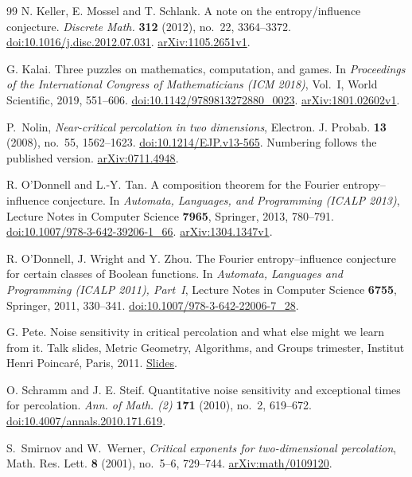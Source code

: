 \begin{thebibliography}{99}
N. Keller, E. Mossel and T. Schlank.
A note on the entropy/influence conjecture.
\emph{Discrete Math.} \textbf{312} (2012), no.~22, 3364--3372.
\href{https://doi.org/10.1016/j.disc.2012.07.031}{doi:10.1016/j.disc.2012.07.031}.
\href{https://arxiv.org/abs/1105.2651v1}{arXiv:1105.2651v1}.

G. Kalai.
Three puzzles on mathematics, computation, and games.
In \emph{Proceedings of the International Congress of Mathematicians (ICM 2018)}, Vol.~I, World Scientific, 2019, 551--606.
\href{https://doi.org/10.1142/9789813272880_0023}{doi:10.1142/9789813272880\_0023}.
\href{https://arxiv.org/abs/1801.02602v1}{arXiv:1801.02602v1}.

P.~Nolin,
\emph{Near-critical percolation in two dimensions},
Electron. J. Probab. \textbf{13} (2008), no.~55, 1562--1623.
\href{https://doi.org/10.1214/EJP.v13-565}{doi:10.1214/EJP.v13-565}.
Numbering follows the published version.
\href{https://arxiv.org/abs/0711.4948}{arXiv:0711.4948}.

R. O'Donnell and L.-Y. Tan.
A composition theorem for the Fourier entropy--influence conjecture.
In \emph{Automata, Languages, and Programming (ICALP 2013)},
Lecture Notes in Computer Science \textbf{7965}, Springer, 2013, 780--791.
\href{https://doi.org/10.1007/978-3-642-39206-1_66}{doi:10.1007/978-3-642-39206-1\_66}.
\href{https://arxiv.org/abs/1304.1347v1}{arXiv:1304.1347v1}.

R. O'Donnell, J. Wright and Y. Zhou.
The Fourier entropy--influence conjecture for certain classes of Boolean functions.
In \emph{Automata, Languages and Programming (ICALP 2011), Part~I},
Lecture Notes in Computer Science \textbf{6755}, Springer, 2011, 330--341.
\href{https://doi.org/10.1007/978-3-642-22006-7_28}{doi:10.1007/978-3-642-22006-7\_28}.

G. Pete.
Noise sensitivity in critical percolation and what else might we learn from it.
Talk slides, Metric Geometry, Algorithms, and Groups trimester,
Institut Henri Poincar\'e, Paris, 2011.
\href{https://math.bme.hu/~gabor/IHP.pdf}{Slides}.

O. Schramm and J. E. Steif.
Quantitative noise sensitivity and exceptional times for percolation.
\emph{Ann. of Math. (2)} \textbf{171} (2010), no.~2, 619--672.
\href{https://doi.org/10.4007/annals.2010.171.619}{doi:10.4007/annals.2010.171.619}.

S.~Smirnov and W.~Werner,
\emph{Critical exponents for two-dimensional percolation},
Math. Res. Lett. \textbf{8} (2001), no.~5--6, 729--744.
\href{https://arxiv.org/abs/math/0109120}{arXiv:math/0109120}.


\end{thebibliography}
